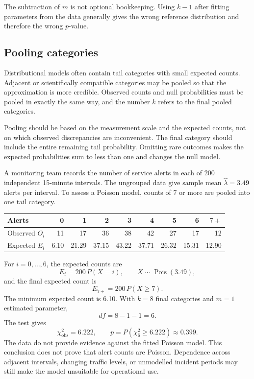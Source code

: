 The subtraction of $m$ is not optional bookkeeping. Using $k-1$ after fitting parameters from the data generally gives the wrong reference distribution and therefore the wrong $p$-value.

\subsection{Pooling categories}

Distributional models often contain tail categories with small expected counts. Adjacent or scientifically compatible categories may be pooled so that the approximation is more credible. Observed counts and null probabilities must be pooled in exactly the same way, and the number $k$ refers to the final pooled categories.

Pooling should be based on the measurement scale and the expected counts, not on which observed discrepancies are inconvenient. The final category should include the entire remaining tail probability. Omitting rare outcomes makes the expected probabilities sum to less than one and changes the null model.

\begin{example}\par
A monitoring team records the number of service alerts in each of 200 independent 15-minute intervals. The ungrouped data give sample mean $\hat\lambda=3.49$ alerts per interval. To assess a Poisson model, counts of 7 or more are pooled into one tail category.

\begin{center}
\small
\begin{tabular}{lrrrrrrrr}
\toprule
Alerts & 0 & 1 & 2 & 3 & 4 & 5 & 6 & $7+$ \\
\midrule
Observed $O_i$ & 11 & 17 & 36 & 38 & 42 & 27 & 17 & 12 \\
Expected $E_i$ & 6.10 & 21.29 & 37.15 & 43.22 & 37.71 & 26.32 & 15.31 & 12.90 \\
\bottomrule
\end{tabular}
\end{center}

For $i=0,\ldots,6$, the expected counts are
\[
E_i=200\,P\!\left(X=i\right),
\qquad X\sim\operatorname{Pois}(3.49),
\]
and the final expected count is
\[
E_{7+}=200\,P(X\geq7).
\]
The minimum expected count is 6.10. With $k=8$ final categories and $m=1$ estimated parameter,
\[
df=8-1-1=6.
\]
The test gives
\[
\chi^2_{\mathrm{obs}}=6.222,
\qquad
p=P(\chi^2_6\geq6.222)\approx0.399.
\]
The data do not provide evidence against the fitted Poisson model. This conclusion does not prove that alert counts are Poisson. Dependence across adjacent intervals, changing traffic levels, or unmodelled incident periods may still make the model unsuitable for operational use.
\end{example}

